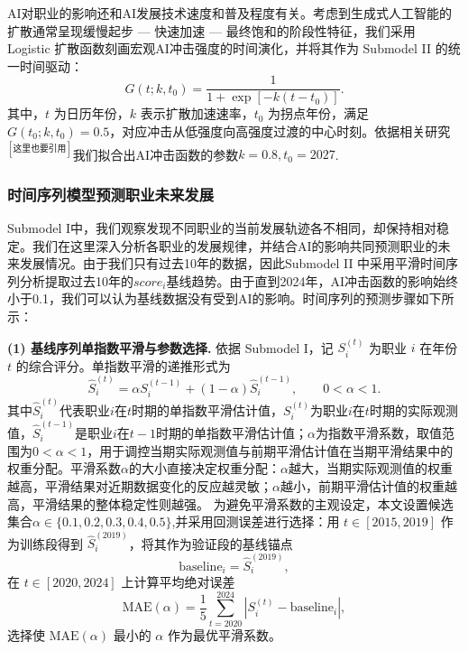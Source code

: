 \documentclass{mcmthesis}
\begin{document}
AI对职业的影响还和AI发展技术速度和普及程度有关。考虑到生成式人工智能的扩散通常呈现缓慢起步 — 快速加速 — 最终饱和的阶段性特征，我们采用 Logistic 扩散函数刻画宏观AI冲击强度的时间演化，并将其作为 Submodel II 的统一时间驱动：
\begin{equation}
G(t;k,t_0)=\frac{1}{1+\exp\!\left[-k\left(t-t_0\right)\right]}.
\label{eq:logistic_shock}
\end{equation}
其中，$t$ 为日历年份，$k$ 表示扩散加速速率，$t_0$ 为拐点年份，满足 $G(t_0;k,t_0)=0.5$，对应冲击从低强度向高强度过渡的中心时刻。依据相关研究$^{[这里也要引用]}$我们拟合出AI冲击函数的参数$k=0.8, t_0=2027$.

\subsubsection{时间序列模型预测职业未来发展}

Submodel I中，我们观察发现不同职业的当前发展轨迹各不相同，却保持相对稳定。我们在这里深入分析各职业的发展规律，并结合AI的影响共同预测职业的未来发展情况。由于我们只有过去10年的数据，因此Submodel II 中采用平滑时间序列分析提取过去10年的$score_i$基线趋势。由于直到2024年，AI冲击函数的影响始终小于0.1，我们可以认为基线数据没有受到AI的影响。时间序列的预测步骤如下所示：

\noindent \textbf{(1) 基线序列单指数平滑与参数选择.}
依据 Submodel I，记 $S_i^{(t)}$ 为职业 $i$ 在年份 $t$ 的综合评分。单指数平滑的递推形式为
\begin{equation}
\widehat{S}_i^{(t)}
=\alpha S_i^{(t-1)}+(1-\alpha)\widehat{S}_i^{(t-1)},
\qquad 0<\alpha<1.
\label{eq:ses_S_cn}
\end{equation}
其中$\widehat{S}_i^{(t)}$代表职业$i$在$t$时期的单指数平滑估计值，$S_i^{(t)}$为职业$i$在$t$时期的实际观测值，$\widehat{S}_i^{(t-1)}$是职业$i$在$t-1$时期的单指数平滑估计值；$\alpha$为指数平滑系数，取值范围为$0<\alpha<1$，用于调控当期实际观测值与前期平滑估计值在当期平滑结果中的权重分配。平滑系数$\alpha$的大小直接决定权重分配：$\alpha$越大，当期实际观测值的权重越高，平滑结果对近期数据变化的反应越灵敏；$\alpha$越小，前期平滑估计值的权重越高，平滑结果的整体稳定性则越强。
为避免平滑系数的主观设定，本文设置候选集合$\alpha\in\{0.1,0.2,0.3,0.4,0.5\}$,并采用回测误差进行选择：用 $t\in[2015,2019]$ 作为训练段得到 $\widehat{S}_i^{(2019)}$，将其作为验证段的基线锚点
\begin{equation}
\mathrm{baseline}_{i}=\widehat{S}_i^{(2019)},
\end{equation}
在 $t\in[2020,2024]$ 上计算平均绝对误差
\begin{equation}
\mathrm{MAE}(\alpha)=\frac{1}{5}\sum_{t=2020}^{2024}\left|S_i^{(t)}-\mathrm{baseline}_{i}\right|,
\label{eq:mae_alpha}
\end{equation}
选择使 $\mathrm{MAE}(\alpha)$ 最小的 $\alpha$ 作为最优平滑系数。
\end{document}

